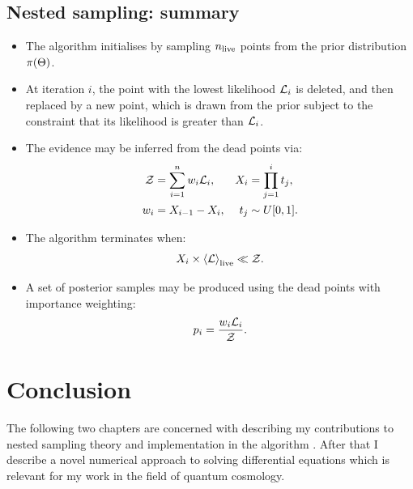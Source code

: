 \subsection{Nested sampling: summary}
\label{sec:bay:comp_space}
\begin{itemize}
  \item The algorithm initialises by sampling $n_{\mathrm{live}}$ points from the prior distribution $\pi(\Theta)$. 
  \item At iteration $i$, the point with the lowest likelihood $\mathcal{L}_i$ is deleted, and then replaced by a new point, which is drawn from the prior subject to the constraint that its likelihood is greater than $\mathcal{L}_i$. 
  \item The evidence may be inferred from the dead points via:
    \begin{align}
      \mathcal{Z} &= \sum_{i=1}^n w_i \mathcal{L}_i, &
      X_i &= \prod_{j=1}^{i} t_j, \nonumber \\
      w_i &= X_{i-1}-X_{i},  & 
      t_j &\sim U[0,1].\nonumber 
    \end{align}
  \item The algorithm terminates when:
    \begin{equation}
      X_i \times {\left\langle{\mathcal{L}}\right\rangle}_{\mathrm{live}} \ll \mathcal{Z}.
    \end{equation}
  \item A set of posterior samples may be produced using the dead points with importance weighting:
    \begin{equation}
      p_i = \frac{w_i\mathcal{L}_i}{\mathcal{Z}}.\nonumber
    \end{equation}

\end{itemize}


\section{Conclusion}
The following two chapters are concerned with describing my contributions to nested sampling theory and implementation in the algorithm \PolyChord{}. After that I describe a novel numerical approach to solving differential equations which is relevant for my work in the field of quantum cosmology.

\begin{subappendices}
  
\end{subappendices}

\cleardoublepage{}
